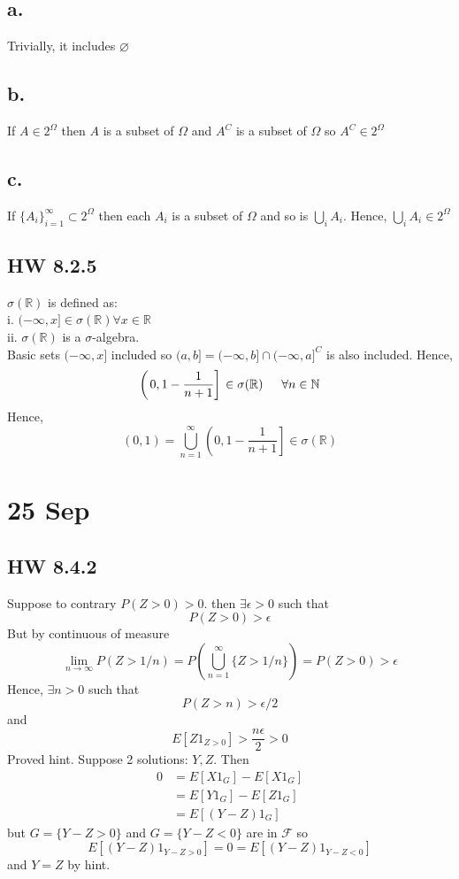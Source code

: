 \documentclass[11pt]{article}
\begin{document}
\subsection*{a.}
Trivially, it includes $\varnothing$
\subsection*{b.}
If $A \in 2^\Omega$ then $A$ is a subset of $\Omega$ and $A^C$ is a subset of $\Omega$ so $A^C \in 2^\Omega$
\subsection*{c.}
If $\{A_i\}_{i=1}^\infty \subset 2^\Omega$ then each $A_i$ is a subset of $\Omega$ and so is $\bigcup_i A_i$. 
Hence, $\bigcup_i A_i \in 2^\Omega$
\subsection{HW 8.2.5}
$\sigma(\mathbb{R})$ is defined as: \\
i. $(-\infty, x]  \in \sigma(\mathbb{R}) \forall x \in \mathbb{R}$ \\
ii. $\sigma(\mathbb{R})$ is a $\sigma$-algebra. \\
Basic sets $(-\infty, x]$ included so $(a,b] = (-\infty, b] \cap (-\infty, a]^C$ is also included. Hence, 
\[
    \left( \left.0,1-\frac{1}{n+1} \right] \right. \in \sigma(\mathbb{R}) \indent  \forall n\in \mathbb{N}   
\]
Hence, 
\[
    (0,1) = \bigcup_{n=1}^\infty \left( \left.0,1-\frac{1}{n+1} \right] \right. \in \sigma(\mathbb{R})
\]
\section{25 Sep}
\subsection{HW 8.4.2}
Suppose to contrary $P(Z >0)>0$. then $\exists \epsilon >0 $ such that 
\[
    P(Z>0)> \epsilon    
\]
But by continuous of measure
\[
    \lim_{n\to \infty} P(Z > 1/n) = P(\bigcup_{n=1}^\infty \{ Z > 1/n\}) = P(Z>0) > \epsilon    
\]
Hence, $\exists n >0$ such that 
\[
    P(Z>n) > \epsilon/2
\]
and 
\[
    E[Z 1_{Z>0}] > \frac{n\epsilon}{2} > 0    
\]
Proved hint.
Suppose 2 solutions: $Y,Z$. Then 
\begin{equation*}
    \begin{aligned}
        0 &= E[X 1_G] - E[X1_G] \\
        &= E[Y 1_G] - E[Z 1_G] \\
        &= E[(Y-Z)1_G]
    \end{aligned}
\end{equation*}
but $G = \{ Y-Z>0\}$ and $G = \{ Y-Z < 0\}$ are in $\mathcal{F}$ so 
\[
    E[(Y-Z) 1_{Y-Z > 0}] = 0 = E[(Y-Z)1_{Y-Z<0}]    
\]
and $Y=Z$ by hint.
\end{document}
